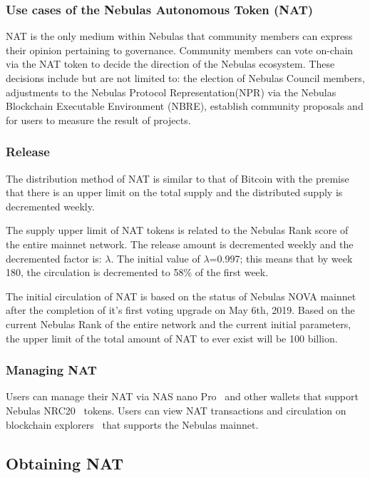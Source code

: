 \subsubsection{Use cases of the Nebulas Autonomous Token (NAT)}


NAT is the only medium within Nebulas that community members can express their opinion pertaining to governance. Community members can vote on-chain via the NAT token to decide the direction of the Nebulas ecosystem. These decisions include but are not limited to: the election of Nebulas Council members, adjustments to the Nebulas Protocol Representation(NPR) via the Nebulas Blockchain Executable Environment (NBRE), establish community proposals and for users to measure the result of projects.

\subsubsection{Release}
	
The distribution method of NAT is similar to that of Bitcoin with the premise that there is an upper limit on the total supply and the distributed supply is decremented weekly.

The supply upper limit of NAT tokens is related to the Nebulas Rank score of the entire mainnet network. The release amount is decremented weekly and the decremented factor is: $\lambda$. The initial value of $\lambda$=0.997; this means that by week 180, the circulation is decremented to 58\% of the first week.

The initial circulation of NAT is based on the status of Nebulas NOVA mainnet after the completion of it's first voting upgrade on May 6th, 2019. Based on the current Nebulas Rank of the entire network and the current initial parameters, the upper limit of the total amount of NAT to ever exist will be 100 billion.

\subsubsection{Managing NAT}

Users can manage their NAT via NAS nano Pro~\cite{NASnano} and other wallets that support Nebulas NRC20~\cite{wallets} tokens. Users can view NAT transactions and circulation on blockchain explorers~\cite{explorer} that supports the Nebulas mainnet.

\subsection{Obtaining NAT}

